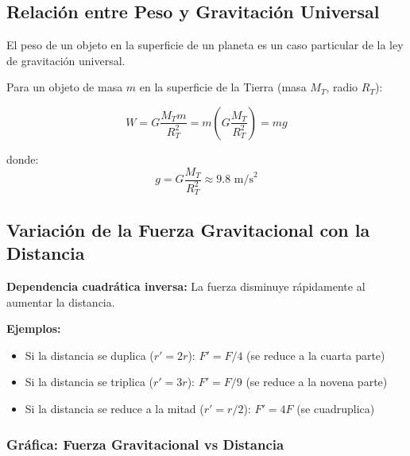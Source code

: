 \subsection{Relación entre Peso y Gravitación Universal}

\begin{seccion}
El peso de un objeto en la superficie de un planeta es un caso particular de la ley de gravitación universal.

Para un objeto de masa $m$ en la superficie de la Tierra (masa $M_T$, radio $R_T$):

\begin{ecuacion}
$$W = G\frac{M_T m}{R_T^2} = m \left(G\frac{M_T}{R_T^2}\right) = mg$$

donde:
$$g = G\frac{M_T}{R_T^2} \approx 9.8 \text{ m/s}^2$$
\end{ecuacion}


\end{seccion}

\subsection{Variación de la Fuerza Gravitacional con la Distancia}

\begin{seccion}
\textbf{Dependencia cuadrática inversa:} La fuerza disminuye rápidamente al aumentar la distancia.

\textbf{Ejemplos:}
\begin{itemize}
    \item Si la distancia se duplica ($r' = 2r$): $F' = F/4$ (se reduce a la cuarta parte)
    \item Si la distancia se triplica ($r' = 3r$): $F' = F/9$ (se reduce a la novena parte)
    \item Si la distancia se reduce a la mitad ($r' = r/2$): $F' = 4F$ (se cuadruplica)
\end{itemize}

\end{seccion}

\subsubsection*{Gráfica: Fuerza Gravitacional vs Distancia}

